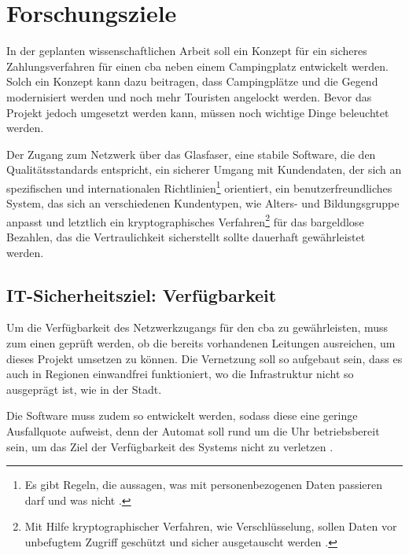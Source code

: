 \section{Forschungsziele}


In der geplanten wissenschaftlichen Arbeit soll ein Konzept für ein sicheres Zahlungsverfahren 
für einen \acrshort{cba} neben einem Campingplatz entwickelt werden. Solch ein Konzept kann
dazu beitragen, dass Campingplätze und die Gegend modernisiert werden und noch mehr Touristen 
angelockt werden. Bevor das Projekt jedoch umgesetzt werden kann, müssen noch wichtige Dinge 
beleuchtet werden. 


Der Zugang zum Netzwerk über das Glasfaser, eine stabile Software, die 
den Qualitätsstandards entspricht, ein sicherer Umgang mit Kundendaten, der sich an spezifischen und
internationalen Richtlinien\footnote{Es gibt Regeln, die aussagen, was mit personenbezogenen Daten passieren
darf und was nicht \cite{refart:DSDS}.} orientiert, ein benutzerfreundliches System, das sich an verschiedenen 
Kundentypen, wie Alters- und Bildungsgruppe anpasst und letztlich ein kryptographisches Verfahren\footnote{Mit
Hilfe kryptographischer Verfahren, wie Verschlüsselung, sollen Daten vor unbefugtem Zugriff geschützt und sicher 
ausgetauscht werden \cite{refart:SLWK}.} für das bargeldlose Bezahlen, das die Vertraulichkeit sicherstellt sollte dauerhaft gewährleistet werden.


\subsection{IT-Sicherheitsziel: Verfügbarkeit}
Um die Verfügbarkeit des Netzwerkzugangs für den \acrshort{cba} zu gewährleisten, muss zum einen 
geprüft werden, ob die bereits vorhandenen Leitungen ausreichen, um dieses Projekt umsetzen zu können.
Die Vernetzung soll so aufgebaut sein, dass es auch in Regionen einwandfrei funktioniert, wo die
Infrastruktur nicht so ausgeprägt ist, wie in der Stadt. 


Die Software muss zudem so entwickelt werden, sodass diese eine geringe Ausfallquote aufweist, denn der
Automat soll rund um die Uhr betriebsbereit sein, um das Ziel der Verfügbarkeit des Systems nicht zu 
verletzen \cite{refbook:SWIS}.

